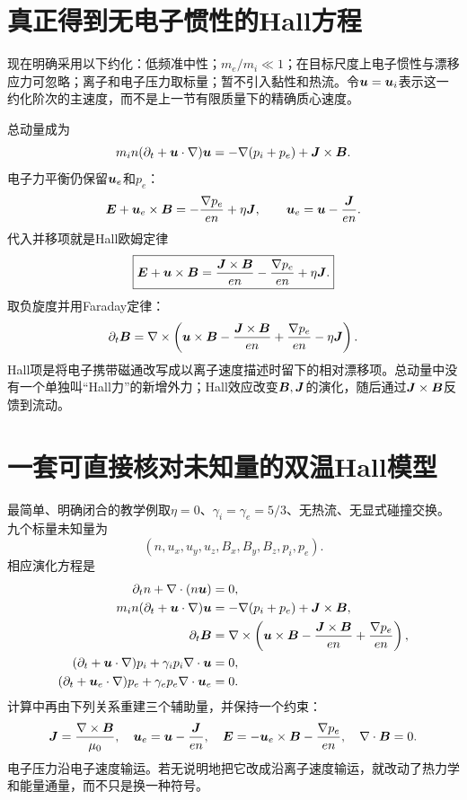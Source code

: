 \section{真正得到无电子惯性的Hall方程}
现在明确采用以下约化：低频准中性；$m_e/m_i\ll1$；在目标尺度上电子惯性与漂移应力可忽略；离子和电子压力取标量；暂不引入黏性和热流。令$\bm{u}=\bm{u}_i$表示这一约化阶次的主速度，而不是上一节有限质量下的精确质心速度。

总动量成为
\begin{equation}
m_in(\partial_t+\bm{u}\cdot\nabla)\bm{u}
=-\nabla(p_i+p_e)+\bm{J}\times\bm{B}.
\end{equation}
电子力平衡仍保留$\bm{u}_e$和$p_e$：
\begin{equation}
\bm{E}+\bm{u}_e\times\bm{B}=-\frac{\nabla p_e}{en}+\eta\bm{J},
\qquad \bm{u}_e=\bm{u}-\frac{\bm{J}}{en}.
\end{equation}
代入并移项就是Hall欧姆定律
\begin{equation}
\boxed{\bm{E}+\bm{u}\times\bm{B}
=\frac{\bm{J}\times\bm{B}}{en}-\frac{\nabla p_e}{en}+\eta\bm{J}.}
\label{hall:eq:hall-ohm}
\end{equation}
取负旋度并用Faraday定律：
\begin{equation}
\partial_t\bm{B}=\nabla\times
\left(\bm{u}\times\bm{B}-\frac{\bm{J}\times\bm{B}}{en}
+\frac{\nabla p_e}{en}-\eta\bm{J}\right).
\label{hall:eq:hall-induction}
\end{equation}
Hall项是将电子携带磁通改写成以离子速度描述时留下的相对漂移项。总动量中没有一个单独叫“Hall力”的新增外力；Hall效应改变$\bm{B},\bm{J}$的演化，随后通过$\bm{J}\times\bm{B}$反馈到流动。

\section{一套可直接核对未知量的双温Hall模型}
最简单、明确闭合的教学例取$\eta=0$、$\gamma_i=\gamma_e=5/3$、无热流、无显式碰撞交换。九个标量未知量为
\begin{equation}
(n,u_x,u_y,u_z,B_x,B_y,B_z,p_i,p_e).
\end{equation}
相应演化方程是
\begin{align}
\partial_tn+\nabla\cdot(n\bm{u})&=0,\\
m_in(\partial_t+\bm{u}\cdot\nabla)\bm{u}
&=-\nabla(p_i+p_e)+\bm{J}\times\bm{B},\\
\partial_t\bm{B}&=\nabla\times
\left(\bm{u}\times\bm{B}-\frac{\bm{J}\times\bm{B}}{en}+\frac{\nabla p_e}{en}\right),\\
(\partial_t+\bm{u}\cdot\nabla)p_i+\gamma_i p_i\nabla\cdot\bm{u}&=0,\\
(\partial_t+\bm{u}_e\cdot\nabla)p_e+\gamma_e p_e\nabla\cdot\bm{u}_e&=0.
\label{hall:eq:closed-hall}
\end{align}
计算中再由下列关系重建三个辅助量，并保持一个约束：
\begin{equation}
\bm{J}=\frac{\nabla\times\bm{B}}{\mu_0},\quad
\bm{u}_e=\bm{u}-\frac{\bm{J}}{en},\quad
\bm{E}=-\bm{u}_e\times\bm{B}-\frac{\nabla p_e}{en},\quad
\nabla\cdot\bm{B}=0.
\end{equation}
电子压力沿电子速度输运。若无说明地把它改成沿离子速度输运，就改动了热力学和能量通量，而不只是换一种符号。

